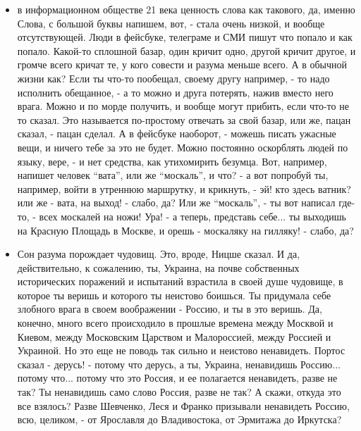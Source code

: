\begin{itemize} %
\item в информационном обществе 21 века ценность слова как такового, да, именно
Слова, с большой буквы напишем, вот, - стала очень низкой, и вообще
отсутствующей. Люди в фейсбуке, телеграме и СМИ пишут что попало и как попало.
Какой-то сплошной базар, один кричит одно, другой кричит другое, и громче всего
кричат те, у кого совести и разума меньше всего.  А в обычной жизни как? Если
ты что-то пообещал, своему другу например, - то надо исполнить обещанное, - а
то можно и друга потерять, нажив вместо него врага. Можно и по морде получить,
и вообще могут прибить, если что-то не то сказал. Это называется по-простому
отвечать за свой базар, или же, пацан сказал, - пацан сделал. А в фейсбуке
наоборот, - можешь писать ужасные вещи, и ничего тебе за это не будет. Можно
постоянно оскорблять людей по языку, вере, - и нет средства, как утихомирить
безумца. Вот, например, напишет человек \enquote{вата}, или же
\enquote{москаль}, и что? - а вот попробуй ты, например, войти в утреннюю
маршрутку, и крикнуть, - эй! кто здесь ватник?  или же - вата, на выход! -
слабо, да? Или же \enquote{москаль}, - ты вот написал где-то, - всех москалей
на ножи! Ура! - а теперь, представь себе... ты выходишь на Красную Площадь в
Москве, и орешь - москаляку на гилляку! - слабо, да?

\item Сон разума порождает чудовищ. Это, вроде, Ницше сказал. И да,
действительно, к сожалению, ты, Украина, на почве собственных исторических
поражений и испытаний взрастила в своей душе чудовище, в которое ты веришь и
которого ты неистово боишься. Ты придумала себе злобного врага в своем
воображении - Россию, и ты в это веришь. Да, конечно, много всего происходило в
прошлые времена между Москвой и Киевом, между Московским Царством и
Малороссией, между Россией и Украиной.  Но это еще не поводь так сильно и
неистово ненавидеть. Портос сказал - дерусь! - потому что дерусь, а ты,
Украина, ненавидишь Россию... потому что... потому что это Россия, и ее
полагается ненавидеть, разве не так? Ты ненавидишь само слово Россия, разве не
так?  А скажи, откуда это все взялось? Разве Шевченко, Леся и Франко призывали
ненавидеть Россию, всю, целиком, - от Ярославля до Владивостока, от Эрмитажа до
Иркутска?

\end{itemize} %

